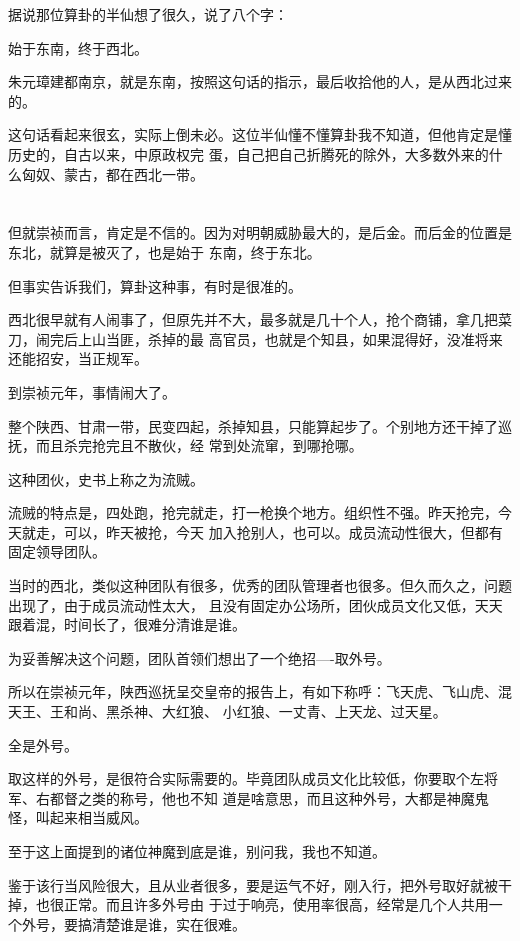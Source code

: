 \documentclass[11pt,a4paper,onecolumn]{article}
\begin{document}
据说那位算卦的半仙想了很久，说了八个字：

始于东南，终于西北。

朱元璋建都南京，就是东南，按照这句话的指示，最后收拾他的人，是从西北过来的。

这句话看起来很玄，实际上倒未必。这位半仙懂不懂算卦我不知道，但他肯定是懂历史的，自古以来，中原政权完
蛋，自己把自己折腾死的除外，大多数外来的什么匈奴、蒙古，都在西北一带。

\section[\thesection]{}

但就崇祯而言，肯定是不信的。因为对明朝威胁最大的，是后金。而后金的位置是东北，就算是被灭了，也是始于
东南，终于东北。

但事实告诉我们，算卦这种事，有时是很准的。

西北很早就有人闹事了，但原先并不大，最多就是几十个人，抢个商铺，拿几把菜刀，闹完后上山当匪，杀掉的最
高官员，也就是个知县，如果混得好，没准将来还能招安，当正规军。

到崇祯元年，事情闹大了。

整个陕西、甘肃一带，民变四起，杀掉知县，只能算起步了。个别地方还干掉了巡抚，而且杀完抢完且不散伙，经
常到处流窜，到哪抢哪。

这种团伙，史书上称之为流贼。

流贼的特点是，四处跑，抢完就走，打一枪换个地方。组织性不强。昨天抢完，今天就走，可以，昨天被抢，今天
加入抢别人，也可以。成员流动性很大，但都有固定领导团队。

当时的西北，类似这种团队有很多，优秀的团队管理者也很多。但久而久之，问题出现了，由于成员流动性太大，
且没有固定办公场所，团伙成员文化又低，天天跟着混，时间长了，很难分清谁是谁。

为妥善解决这个问题，团队首领们想出了一个绝招----取外号。

所以在崇祯元年，陕西巡抚呈交皇帝的报告上，有如下称呼：飞天虎、飞山虎、混天王、王和尚、黑杀神、大红狼、
小红狼、一丈青、上天龙、过天星。

全是外号。

取这样的外号，是很符合实际需要的。毕竟团队成员文化比较低，你要取个左将军、右都督之类的称号，他也不知
道是啥意思，而且这种外号，大都是神魔鬼怪，叫起来相当威风。

至于这上面提到的诸位神魔到底是谁，别问我，我也不知道。

鉴于该行当风险很大，且从业者很多，要是运气不好，刚入行，把外号取好就被干掉，也很正常。而且许多外号由
于过于响亮，使用率很高，经常是几个人共用一个外号，要搞清楚谁是谁，实在很难。
\end{document}
